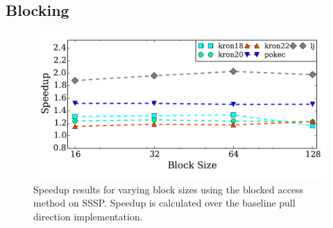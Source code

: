  
\subsection{Blocking}
\begin{figure}[t]
    \centering
    \includegraphics[scale=0.5]{graphit-figures/sssp-block.pdf}
    \caption{Speedup results for varying block sizes using the blocked access method on SSSP. Speedup is calculated over the baseline pull direction implementation.}
    \label{pap:generals:sec:eval:fig:ssspblock}
\end{figure}
 
